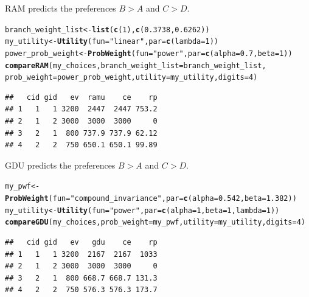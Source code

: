 \documentclass{article}\usepackage[]{graphicx}\usepackage[]{color}
\makeatletter
\newcommand{\hlnum}[1]{\textcolor[rgb]{0.686,0.059,0.569}{#1}}%
\newcommand{\hlstr}[1]{\textcolor[rgb]{0.192,0.494,0.8}{#1}}%
\newcommand{\hlstd}[1]{\textcolor[rgb]{0.345,0.345,0.345}{#1}}%
\newcommand{\hlkwb}[1]{\textcolor[rgb]{0.69,0.353,0.396}{#1}}%
\newcommand{\hlkwc}[1]{\textcolor[rgb]{0.333,0.667,0.333}{#1}}%
\newcommand{\hlkwd}[1]{\textcolor[rgb]{0.737,0.353,0.396}{\textbf{#1}}}%
\newenvironment{kframe}{%
 \def\at@end@of@kframe{}%
 \ifinner\ifhmode%
  \def\at@end@of@kframe{\end{minipage}}%
  \begin{minipage}{\columnwidth}%
 \fi\fi%
 \def\FrameCommand##1{\hskip\@totalleftmargin \hskip-\fboxsep
 \colorbox{shadecolor}{##1}\hskip-\fboxsep
     \hskip-\linewidth \hskip-\@totalleftmargin \hskip\columnwidth}%
 \MakeFramed {\advance\hsize-\width
   \@totalleftmargin\z@ \linewidth\hsize
   \@setminipage}}%
 {\par\unskip\endMakeFramed%
 \at@end@of@kframe}
\newenvironment{knitrout}{}{} %
\makeatother
\begin{document}
RAM predicts the preferences $B > A$ and $C > D$.

\begin{knitrout}
\color{fgcolor}\begin{kframe}
\begin{alltt}
\hlstd{branch_weight_list} \hlkwb{<-} \hlkwd{list}\hlstd{(}\hlkwd{c}\hlstd{(}\hlnum{1}\hlstd{),} \hlkwd{c}\hlstd{(}\hlnum{0.3738}\hlstd{,} \hlnum{0.6262}\hlstd{))}
\hlstd{my_utility} \hlkwb{<-} \hlkwd{Utility}\hlstd{(}\hlkwc{fun}\hlstd{=}\hlstr{"linear"}\hlstd{,} \hlkwc{par}\hlstd{=}\hlkwd{c}\hlstd{(}\hlkwc{lambda}\hlstd{=}\hlnum{1}\hlstd{))}
\hlstd{power_prob_weight} \hlkwb{<-} \hlkwd{ProbWeight}\hlstd{(}\hlkwc{fun}\hlstd{=}\hlstr{"power"}\hlstd{,} \hlkwc{par}\hlstd{=}\hlkwd{c}\hlstd{(}\hlkwc{alpha}\hlstd{=}\hlnum{0.7}\hlstd{,} \hlkwc{beta}\hlstd{=}\hlnum{1}\hlstd{))}
\hlkwd{compareRAM}\hlstd{(my_choices,} \hlkwc{branch_weight_list}\hlstd{=branch_weight_list,}
        \hlkwc{prob_weight}\hlstd{=power_prob_weight,} \hlkwc{utility}\hlstd{=my_utility,} \hlkwc{digits}\hlstd{=}\hlnum{4}\hlstd{)}
\end{alltt}
\begin{verbatim}
##   cid gid   ev  ramu    ce    rp
## 1   1   1 3200  2447  2447 753.2
## 2   1   2 3000  3000  3000     0
## 3   2   1  800 737.9 737.9 62.12
## 4   2   2  750 650.1 650.1 99.89
\end{verbatim}
\end{kframe}
\end{knitrout}


GDU predicts the preferences $B > A$ and $C > D$.

\begin{knitrout}
\color{fgcolor}\begin{kframe}
\begin{alltt}
\hlstd{my_pwf} \hlkwb{<-} \hlkwd{ProbWeight}\hlstd{(}\hlkwc{fun}\hlstd{=}\hlstr{"compound_invariance"}\hlstd{,} \hlkwc{par}\hlstd{=}\hlkwd{c}\hlstd{(}\hlkwc{alpha}\hlstd{=}\hlnum{0.542}\hlstd{,} \hlkwc{beta}\hlstd{=}\hlnum{1.382}\hlstd{))}
\hlstd{my_utility} \hlkwb{<-} \hlkwd{Utility}\hlstd{(}\hlkwc{fun}\hlstd{=}\hlstr{"power"}\hlstd{,} \hlkwc{par}\hlstd{=}\hlkwd{c}\hlstd{(}\hlkwc{alpha}\hlstd{=}\hlnum{1}\hlstd{,} \hlkwc{beta}\hlstd{=}\hlnum{1}\hlstd{,} \hlkwc{lambda}\hlstd{=}\hlnum{1}\hlstd{))}
\hlkwd{compareGDU}\hlstd{(my_choices,} \hlkwc{prob_weight}\hlstd{=my_pwf,} \hlkwc{utility}\hlstd{=my_utility,} \hlkwc{digits}\hlstd{=}\hlnum{4}\hlstd{)}
\end{alltt}
\begin{verbatim}
##   cid gid   ev   gdu    ce    rp
## 1   1   1 3200  2167  2167  1033
## 2   1   2 3000  3000  3000     0
## 3   2   1  800 668.7 668.7 131.3
## 4   2   2  750 576.3 576.3 173.7
\end{verbatim}
\end{kframe}
\end{knitrout}
\end{document}
